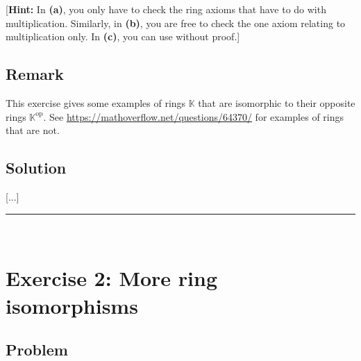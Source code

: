 \documentclass[paper=a4, fontsize=12pt]{scrartcl} %
\newcommand{\KK}{\mathbb{K}} %
\newcommand{\op}{\operatorname{op}} %
\newcommand{\horrule}[1]{\rule{\linewidth}{#1}} %
\theoremstyle{plainsl}
\theoremstyle{definition}
\theoremstyle{remark}
\begin{document}
[\textbf{Hint:} In \textbf{(a)}, you only have to check the ring axioms that
have to do with multiplication.
Similarly, in \textbf{(b)}, you are free to check the one axiom relating
to multiplication only.
In \textbf{(c)}, you can use \cite[Exercise 6.5]{detnotes} without proof.]

\subsection{Remark}

This exercise gives some examples of rings $\KK$ that are isomorphic
to their opposite rings $\KK^{\op}$. See
\url{https://mathoverflow.net/questions/64370/} for examples of rings
that are not.

\subsection{Solution}

[...]

\horrule{0.3pt} \\[0.4cm]

\section{Exercise 2: More ring isomorphisms}

\subsection{Problem}
\end{document}
